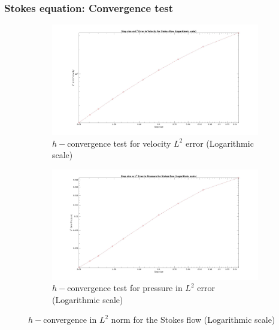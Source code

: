 \documentclass{beamer}
\begin{document}
\begin{frame}
\frametitle{Stokes equation: Convergence test}
\begin{figure}
\begin{subfigure}{0.4\textwidth}	
  \includegraphics[width=\linewidth]{l2_velocity_log_stokes.jpg}
  \caption{$h-$convergence test for velocity $L^2$ error (Logarithmic scale)}
  \label{fig:vel_stoke_conv_log}
\end{subfigure}
\begin{subfigure}{0.4\textwidth}	
  \includegraphics[width=\linewidth]{l2_pressure_log_stokes.jpg}
  \caption{$h-$convergence test for pressure in $L^2$ error (Logarithmic scale)}
  \label{fig:pre_stoke_conv_log}
\end{subfigure}
\caption{$h-$convergence in $L^2$ norm for the Stokes flow (Logarithmic scale)}
\label{fig:l2_stokes}
\end{figure}
\end{frame}
\end{document}
